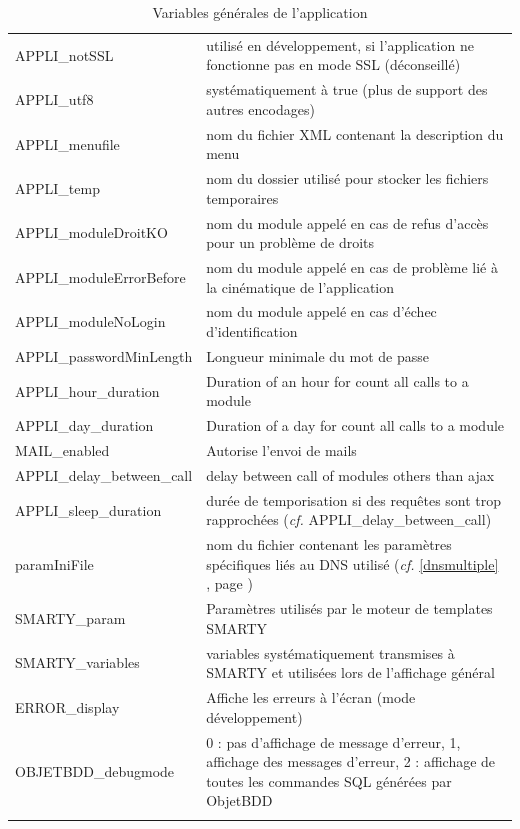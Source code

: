 \begin{longtable}{|p{5cm}|p{8cm}|}
APPLI\_notSSL & utilisé en développement, si l'application ne fonctionne pas en mode SSL (déconseillé) \\

APPLI\_utf8 & systématiquement à true (plus de support des autres encodages)\\

APPLI\_menufile & nom du fichier XML contenant la description du menu\\

APPLI\_temp & nom du dossier utilisé pour stocker les fichiers temporaires\\

APPLI\_moduleDroitKO & nom du module appelé en cas de refus d'accès pour un problème de droits \\

APPLI\_moduleErrorBefore & nom du module appelé en cas de problème lié à la cinématique de l'application\\

APPLI\_moduleNoLogin & nom du module appelé en cas d'échec d'identification \\

APPLI\_passwordMinLength  & Longueur minimale du mot de passe \\
APPLI\_hour\_duration  & Duration of an hour for count all calls to a module\\
APPLI\_day\_duration  & Duration of a day for count all calls to a module \\
MAIL\_enabled & Autorise l'envoi de mails \\
APPLI\_delay\_between\_call & delay between call of modules others than ajax \\
APPLI\_sleep\_duration  & durée de temporisation si des requêtes sont trop rapprochées (\textit{cf.} APPLI\_delay\_between\_call) \\

paramIniFile & nom du fichier contenant les paramètres spécifiques liés au DNS utilisé (\textit{cf.} \ref{dnsmultiple} \textit{\nameref{dnsmultiple}}, page \pageref{dnsmultiple}) \\

SMARTY\_param & Paramètres utilisés par le moteur de templates SMARTY\\

SMARTY\_variables & variables systématiquement transmises à SMARTY et utilisées lors de l'affichage général\\

ERROR\_display & Affiche les erreurs à l'écran (mode développement)\\

OBJETBDD\_debugmode & 0 : pas d'affichage de message d'erreur, 1, affichage des messages d'erreur, 2 : affichage de toutes les commandes SQL générées par ObjetBDD \\
\hline

\caption{Variables générales de l'application}
\end{longtable} 

